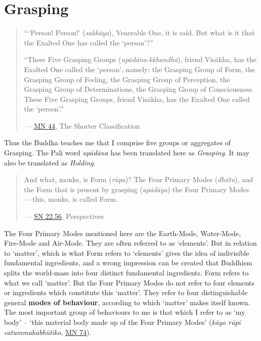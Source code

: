 \chapter{Grasping}

\begin{quote}
``\,`Person! Person!' (\emph{sakkāya}), Venerable One, it is said. But what is it that the Exalted One has called the `person'?''

``These Five Grasping Groups (\emph{upādāna-kkhandhā}), friend Visākha, has the Exalted One called the `person', namely: the Grasping Group of Form, the Grasping Group of Feeling, the Grasping Group of Perception, the Grasping Group of Determinations, the Grasping Group of Consciousness. These Five Grasping Groups, friend Visākha, has the Exalted One called the `person'.''

 --- \href{https://suttacentral.net/mn44/en/sujato}{MN 44}, The Shorter Classification
\end{quote}

Thus the Buddha teaches me that I comprise five groups or aggregates of Grasping. The Pali word \emph{upādāna} has been translated here as \emph{Grasping}. It may also be translated as \emph{Holding}.

\begin{quote}
And what, monks, is Form (\emph{rūpa})? The Four Primary Modes (\emph{dhātu}), and the Form that is present by grasping (\emph{upādāya}) the Four Primary Modes --- this, monks, is called Form.

 --- \href{https://suttacentral.net/sn22.56/en/bodhi}{SN 22.56}, Perspectives
\end{quote}

The Four Primary Modes mentioned here are the Earth-Mode, Water-Mode, Fire-Mode and Air-Mode. They are often referred to as `elements'. But in relation to `matter', which is what Form refers to `elements' gives the idea of indivisible fundamental ingredients, and a wrong impression can be created that Buddhism splits the world-mass into four distinct fundamental ingredients. Form refers to what we call `matter'. But the Four Primary Modes do not refer to four elements or ingredients which constitute this `matter'. They refer to four distinguishable general \textbf{modes of behaviour}, according to which `matter' makes itself known. The most important group of behaviours to me is that which I refer to as `my body' -- `this material body made up of the Four Primary Modes' (\emph{kāyo rūpī catummahābhūtiko}, \href{https://suttacentral.net/mn74/en/sujato}{MN 74}).

